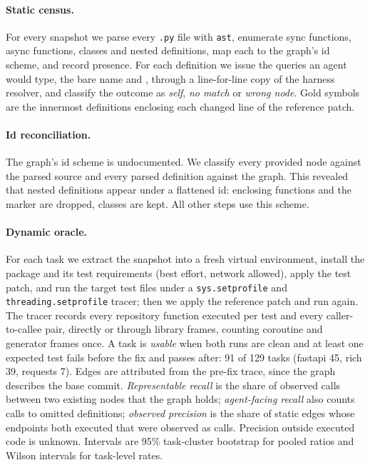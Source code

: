 \documentclass[10pt,a4paper]{article}
\newcommand{\code}[1]{\path{#1}}
\begin{document}
\paragraph{Static census.} For every snapshot we parse every \texttt{.py} file with \texttt{ast}, enumerate sync functions, async functions, classes and nested definitions, map each to the graph's id scheme, and record presence. For each definition we issue the queries an agent would type, the bare name and \code{Class.method}, through a line-for-line copy of the harness resolver, and classify the outcome as \emph{self}, \emph{no match} or \emph{wrong node}. Gold symbols are the innermost definitions enclosing each changed line of the reference patch.

\paragraph{Id reconciliation.} The graph's id scheme is undocumented. We classify every provided node against the parsed source and every parsed definition against the graph. This revealed that nested definitions appear under a flattened id: enclosing functions and the \code{<locals>} marker are dropped, classes are kept. All other steps use this scheme.

\paragraph{Dynamic oracle.} For each task we extract the snapshot into a fresh virtual environment, install the package and its test requirements (best effort, network allowed), apply the test patch, and run the target test files under a \texttt{sys.setprofile} and \texttt{threading.setprofile} tracer; then we apply the reference patch and run again. The tracer records every repository function executed per test and every caller-to-callee pair, directly or through library frames, counting coroutine and generator frames once. A task is \emph{usable} when both runs are clean and at least one expected test fails before the fix and passes after: 91 of 129 tasks (fastapi 45, rich 39, requests 7). Edges are attributed from the pre-fix trace, since the graph describes the base commit. \emph{Representable recall} is the share of observed calls between two existing nodes that the graph holds; \emph{agent-facing recall} also counts calls to omitted definitions; \emph{observed precision} is the share of static edges whose endpoints both executed that were observed as calls. Precision outside executed code is unknown. Intervals are 95\% task-cluster bootstrap for pooled ratios and Wilson intervals for task-level rates.
\end{document}
